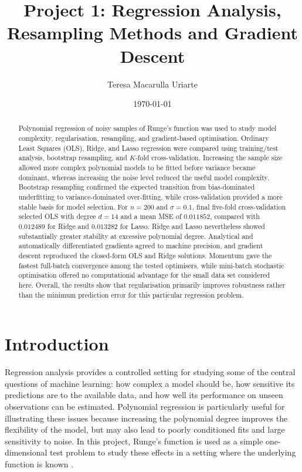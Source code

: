 \documentclass[aps,rmp,reprint,amsmath,amssymb,graphicx,longbibliography]{revtex4-1}
\begin{document}
\title{Project 1: Regression Analysis, Resampling Methods and Gradient Descent}

\author{Teresa Macarulla Uriarte}
\date{\today}

\begin{abstract}
Polynomial regression of noisy samples of Runge's function was used to study
model complexity, regularisation, resampling, and gradient-based optimisation.
Ordinary Least Squares (OLS), Ridge, and Lasso regression were compared using
training/test analysis, bootstrap resampling, and $K$-fold cross-validation.
Increasing the sample size allowed more complex polynomial models to be fitted
before variance became dominant, whereas increasing the noise level reduced
the useful model complexity. Bootstrap resampling confirmed the expected
transition from bias-dominated underfitting to variance-dominated
over-fitting, while cross-validation provided a more stable basis for model
selection. For $n=200$ and $\sigma=0.1$, final five-fold cross-validation
selected OLS with degree $d=14$ and a mean MSE of $0.011852$, compared with
$0.012489$ for Ridge and $0.013282$ for Lasso. Ridge and Lasso nevertheless
showed substantially greater stability at excessive polynomial degree.
Analytical and automatically differentiated gradients agreed to machine
precision, and gradient descent reproduced the closed-form OLS and Ridge
solutions. Momentum gave the fastest full-batch convergence among the tested
optimisers, while mini-batch stochastic optimisation offered no computational
advantage for the small data set considered here. Overall, the results show
that regularisation primarily improves robustness rather than the minimum
prediction error for this particular regression problem.
\end{abstract}

\maketitle

\tableofcontents

\section{Introduction}

Regression analysis provides a controlled setting for studying some of the
central questions of machine learning: how complex a model should be, how
sensitive its predictions are to the available data, and how well its
performance on unseen observations can be estimated. Polynomial regression is
particularly useful for illustrating these issues because increasing the
polynomial degree improves the flexibility of the model, but may also lead to
poorly conditioned fits and large sensitivity to noise. In this project,
Runge's function is used as a simple one-dimensional test problem to study
these effects in a setting where the underlying function is known
\cite{UiOProject1_2026}.
\end{document}
